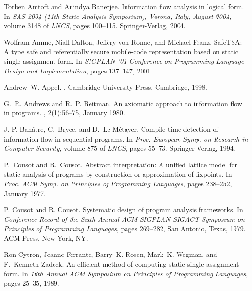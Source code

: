 \documentclass{sigplanconf}
\begin{document}

\newcommand{\etalchar}[1]{$^{#1}$}
\begin{thebibliography}{ADvRF01}

Torben Amtoft and Anindya Banerjee.
\newblock Information flow analysis in logical form.
\newblock In {\em SAS 2004 (11th Static Analysis Symposium), Verona, Italy,
  August 2004}, volume 3148 of {\em LNCS}, pages 100--115. Springer-Verlag,
  2004.

Wolfram Amme, Niall Dalton, Jeffery von Ronne, and Michael Franz.
\newblock Safe{TSA}: {A} type safe and referentially secure mobile-code
  representation based on static single assignment form.
\newblock In {\em {SIGPLAN} '01 Conference on Programming Language Design and
  Implementation}, pages 137--147, 2001.

Andrew~W. Appel.
.
\newblock Cambridge University Press, Cambridge, 1998.

G.~R. Andrews and R.~P. Reitman.
\newblock An axiomatic approach to information flow in programs.
, 2(1):56--75, January 1980.

J.-P. Ban\^atre, C.~Bryce, and D.~{Le M\'etayer}.
\newblock Compile-time detection of information flow in sequential programs.
\newblock In {\em Proc. European Symp. on Research in Computer Security},
  volume 875 of {\em LNCS}, pages 55--73. Springer-Verlag, 1994.

P.~Cousot and R.~Cousot.
\newblock Abstract interpretation: {A} unified lattice model for static
  analysis of programs by construction or approximation of fixpoints.
\newblock In {\em Proc. ACM Symp. on Principles of Programming Languages},
  pages 238--252, January 1977.

P{.} Cousot and R{.} Cousot.
\newblock Systematic design of program analysis frameworks.
\newblock In {\em Conference Record of the Sixth Annual ACM SIGPLAN-SIGACT
  Symposium on Principles of Programming Languages}, pages 269--282, San
  Antonio, Texas, 1979. ACM Press, New York, NY.

\bibitem[CFR{\etalchar{+}}89]{SSA}
Ron Cytron, Jeanne Ferrante, Barry~K. Rosen, Mark~K. Wegman, and F.~Kenneth
  Zadeck.
\newblock An efficient method of computing static single assignment form.
\newblock In {\em 16th Annual ACM Symposium on Principles of Programming
  Languages}, pages 25--35, 1989.


\end{thebibliography}
\end{document}
